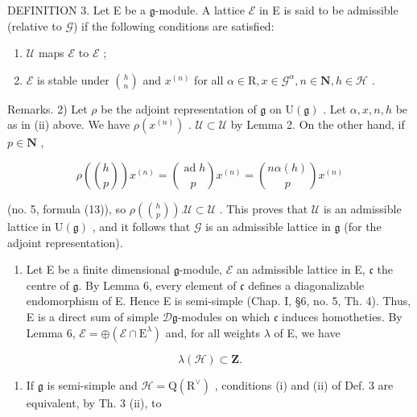 DEFINITION 3. Let E be a \(\mathfrak{g}\)-module. A lattice \(\mathcal{E}\) in E is said to be admissible (relative to \(\mathcal{G}\)) if the following conditions are satisfied:

\begin{enumerate}
\def\labelenumi{(\roman{enumi})}
\item
  \(\mathcal{U}\) maps \(\mathcal{E}\) to \(\mathcal{E}\) ;
\item
  \(\mathcal{E}\) is stable under \(\binom{h}{n}\) and \(x^{(n)}\) for all \(\alpha \in \mathrm{R}, x \in \mathcal{G}^{\alpha}, n \in \mathbf{N}, h \in \mathcal{H}\) .
\end{enumerate}

Remarks. 2) Let \(\rho\) be the adjoint representation of \(\mathfrak{g}\) on \(\mathrm{U}(\mathfrak{g})\) . Let \(\alpha, x, n, h\) be as in (ii) above. We have \(\rho(x^{(n)})\) . \(\mathcal{U} \subset \mathcal{U}\) by Lemma 2. On the other hand, if \(p \in \mathbf{N}\) ,

\[
\rho \left(\binom{h}{p}\right) x ^ {(n)} = \binom{\operatorname{ad} h}{p} x ^ {(n)} = \binom{n \alpha (h)}{p} x ^ {(n)}
\]

(no. 5, formula (13)), so \(\rho\left(\binom{h}{p}\right). \mathcal{U} \subset \mathcal{U}\) . This proves that \(\mathcal{U}\) is an admissible lattice in \(\mathrm{U}(\mathfrak{g})\) , and it follows that \(\mathcal{G}\) is an admissible lattice in \(\mathfrak{g}\) (for the adjoint representation).

\begin{enumerate}
\def\labelenumi{\arabic{enumi})}
\setcounter{enumi}{2}
\tightlist
\item
  Let E be a finite dimensional \(\mathfrak{g}\)-module, \(\mathcal{E}\) an admissible lattice in E, \(\mathfrak{c}\) the centre of \(\mathfrak{g}\). By Lemma 6, every element of \(\mathfrak{c}\) defines a diagonalizable endomorphism of E. Hence E is semi-simple (Chap. I, §6, no. 5, Th. 4). Thus, E is a direct sum of simple \(\mathcal{D}\mathfrak{g}\)-modules on which \(\mathfrak{c}\) induces homotheties. By Lemma 6, \(\mathcal{E}=\oplus(\mathcal{E}\cap\mathrm{E}^{\lambda})\) and, for all weights \(\lambda\) of E, we have
\end{enumerate}

\[
\lambda (\mathcal {H}) \subset \mathbf {Z}.
\]

\begin{enumerate}
\def\labelenumi{\arabic{enumi})}
\setcounter{enumi}{3}
\tightlist
\item
  If \(\mathfrak{g}\) is semi-simple and \(\mathcal{H} = \mathrm{Q}(\mathrm{R}^{\vee})\) , conditions (i) and (ii) of Def. 3 are equivalent, by Th. 3 (ii), to
\end{enumerate}

